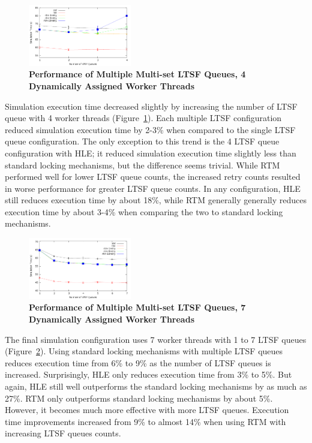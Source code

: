 \documentclass{sig-alternate}
\begin{document}
\begin{figure}
    \centering
    \graphicspath{ {./figures/} }
    \includegraphics[width=0.4\textwidth,keepaspectratio]{hugeepidemicsim-CONTmig-timeVSschedQs-multiset-4thread}
    \caption{\textbf{Performance of Multiple Multi-set LTSF Queues, 4 Dynamically Assigned Worker Threads}}
    \label{fig:contThrMig_timeVSschq_4threads}
\end{figure}

Simulation execution time decreased slightly by increasing the number of LTSF queue with 4
worker threads (Figure~\ref{fig:contThrMig_timeVSschq_4threads}).  Each multiple LTSF
configuration reduced simulation execution time by 2-3\% when compared to the single LTSF
queue configuration.  The only exception to this trend is the 4 LTSF queue configuration
with HLE; it reduced simulation execution time slightly less than standard locking
mechanisms, but the difference seems trivial.  While RTM performed well for lower LTSF
queue counts, the increased retry counts resulted in worse performance for greater LTSF
queue counts.  In any configuration, HLE still reduces execution time by about 18\%, while
RTM generally generally reduces execution time by about 3-4\% when comparing the two to
standard locking mechanisms.

\begin{figure}
    \centering
    \graphicspath{ {./figures/} }
    \includegraphics[width=0.4\textwidth,keepaspectratio]{hugeepidemicsim-CONTmig-timeVSschedQs-multiset-7thread}
    \caption{\textbf{Performance of Multiple Multi-set LTSF Queues, 7 Dynamically Assigned Worker Threads}}
    \label{fig:contThrMig_timeVSschq_7threads}
\end{figure}

The final simulation configuration uses 7 worker threads with 1 to 7 LTSF queues
(Figure~\ref{fig:contThrMig_timeVSschq_7threads}).  Using standard locking mechanisms with
multiple LTSF queues reduces execution time from 6\% to 9\% as the number of LTSF queues
is increased.  Surprisingly, HLE only reduces execution time from 3\% to 5\%.  But again,
HLE still well outperforms the standard locking mechanisms by as much as 27\%.  RTM only
outperforms standard locking mechanisms by about 5\%.  However, it becomes much more
effective with more LTSF queues.  Execution time improvements increased from 9\% to almost
14\% when using RTM with increasing LTSF queues counts.
\end{document}
